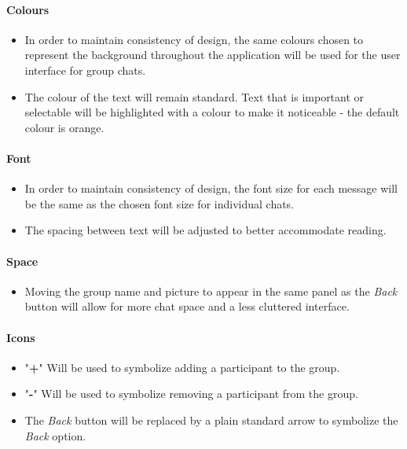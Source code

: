 \documentclass[11pt]{article}
\begin{document}
\paragraph{Colours}
\begin{itemize}
\item	In order to maintain consistency of design, the same colours chosen to represent the background throughout the application will be used for the user interface for group chats.
\item	The colour of the text will remain standard. Text that is important or selectable will be highlighted with a colour to make it noticeable - the default colour is orange. 	\\
\end{itemize}

\paragraph{Font}
\begin{itemize}
\item	In order to maintain consistency of design, the font size for each message will be the same as the chosen font size for individual chats.
\item The spacing between text will be adjusted to better accommodate reading.\\
\end{itemize}

\paragraph{Space}
\begin{itemize}
\item	Moving the group name and picture to appear in the same panel as the \textit{Back} button will allow for more chat space and a less cluttered interface.
\end{itemize}

\paragraph{Icons}
\begin{itemize}
\item	"\textbf{+}" Will be used to symbolize adding a participant to the group.  
\item "\textbf{-}" Will be used to symbolize removing a participant from the group.
\item The \textit{Back} button will be replaced by a plain standard arrow to symbolize the \textit{Back} option.  
\end{itemize}
\end{document}
